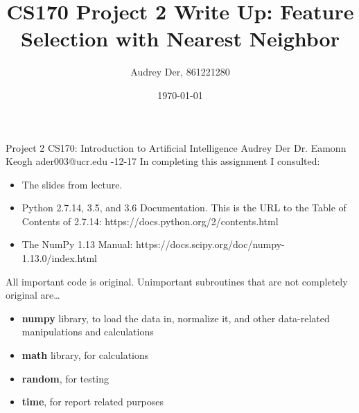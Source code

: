 \documentclass{article}
\begin{document}

\begin{titlepage}
	\noindent Project 2 \hfill CS170: Introduction to Artificial Intelligence \newline \newline
	Audrey Der \hfill Dr. Eamonn Keogh  \newline
	ader003@ucr.edu -12-17 \newline \newline \newline
	In completing this assignment I consulted:
	\begin{itemize}
		\item The slides from lecture.
        \item Python 2.7.14, 3.5, and 3.6 Documentation. This is the URL to the Table of Contents of 2.7.14:  https://docs.python.org/2/contents.html
        \item The NumPy 1.13 Manual: https://docs.scipy.org/doc/numpy-1.13.0/index.html
	\end{itemize}
	All important code is original. Unimportant subroutines that are not completely original are\ldots
	\begin{itemize}
		\item \textbf{numpy} library, to load the data in, normalize it, and other data-related manipulations and calculations
        \item \textbf{math} library, for calculations
        \item \textbf{random}, for testing
        \item \textbf{time}, for report related purposes
        \end{itemize}
        \end{titlepage}


\title{CS170 Project 2 Write Up: Feature Selection with Nearest Neighbor}
\author{Audrey Der, 861221280}
\date{\today}
\maketitle
\end{document}
